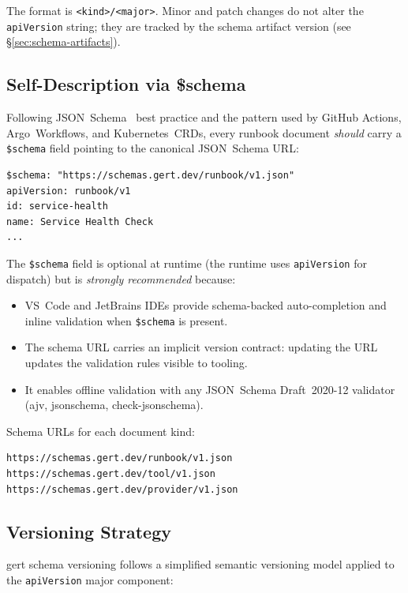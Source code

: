 The format is \texttt{<kind>/<major>}.  Minor and patch changes do not alter
the \texttt{apiVersion} string; they are tracked by the schema artifact version
(see \S\ref{sec:schema-artifacts}).

\subsection{Self-Description via \$schema}
\label{subsec:self-description}

Following JSON~Schema~\cite{jsonschema-spec} best practice and the pattern used by GitHub Actions,
Argo~Workflows, and Kubernetes~CRDs, every runbook document \emph{should} carry a
\texttt{\$schema} field pointing to the canonical JSON~Schema URL:

\begin{verbatim}
$schema: "https://schemas.gert.dev/runbook/v1.json"
apiVersion: runbook/v1
id: service-health
name: Service Health Check
...
\end{verbatim}

The \texttt{\$schema} field is optional at runtime (the runtime uses
\texttt{apiVersion} for dispatch) but is \emph{strongly recommended} because:

\begin{itemize}
  \item VS~Code and JetBrains IDEs provide schema-backed auto-completion and
        inline validation when \texttt{\$schema} is present.
  \item The schema URL carries an implicit version contract: updating the URL
        updates the validation rules visible to tooling.
  \item It enables offline validation with any JSON~Schema Draft~2020-12
        validator (ajv, jsonschema, check-jsonschema).
\end{itemize}

Schema URLs for each document kind:

\begin{verbatim}
https://schemas.gert.dev/runbook/v1.json
https://schemas.gert.dev/tool/v1.json
https://schemas.gert.dev/provider/v1.json
\end{verbatim}

\subsection{Versioning Strategy}
\label{subsec:versioning-strategy}

gert schema versioning follows a simplified semantic versioning model applied
to the \texttt{apiVersion} major component:


